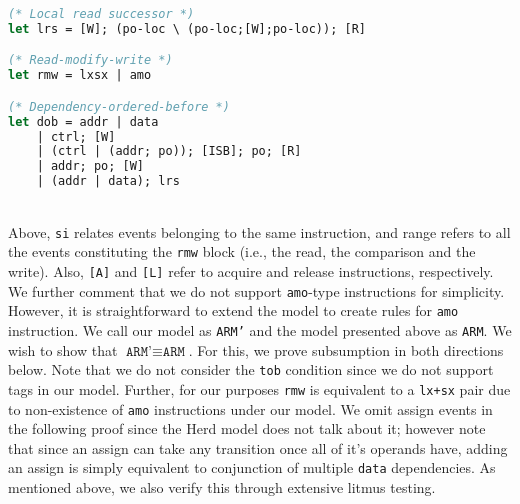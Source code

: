 \documentclass{article}
\newcommand{\var}{\texttt}
\begin{document}
\begin{minipage}{.55\textwidth}
\begin{lstlisting}[language=ML]
(* Local read successor *)
let lrs = [W]; (po-loc \ (po-loc;[W];po-loc)); [R]

(* Read-modify-write *)
let rmw = lxsx | amo

(* Dependency-ordered-before *)
let dob = addr | data
	| ctrl; [W]
	| (ctrl | (addr; po)); [ISB]; po; [R]
	| addr; po; [W]
	| (addr | data); lrs
\end{lstlisting}
\end{minipage}\\
Above, \var{si} relates events belonging to the same instruction, and range refers to all the events constituting the \var{rmw} block (i.e., the read, the comparison and the write). Also, \var{[A]} and \var{[L]} refer to acquire and release instructions, respectively.\\
We further comment that we do not support \var{amo}-type instructions for simplicity. However, it is straightforward to extend the model to create rules for \var{amo} instruction. We call our model as \var{ARM'} and the model presented above as \var{ARM}. We wish to show that $\var{ARM'} \equiv \var{ARM}$. For this, we prove subsumption in both directions below. Note that we do not consider the \var{tob} condition since we do not support tags in our model. Further, for our purposes \var{rmw} is equivalent to a \var{lx+sx} pair due to non-existence of \var{amo} instructions under our model. We omit assign events in the following proof since the Herd model does not talk about it; however note that since an assign can take any transition once all of it's operands have, adding an assign is simply equivalent to conjunction of multiple \var{data} dependencies. As mentioned above, we also verify this through extensive litmus testing.
\end{document}
